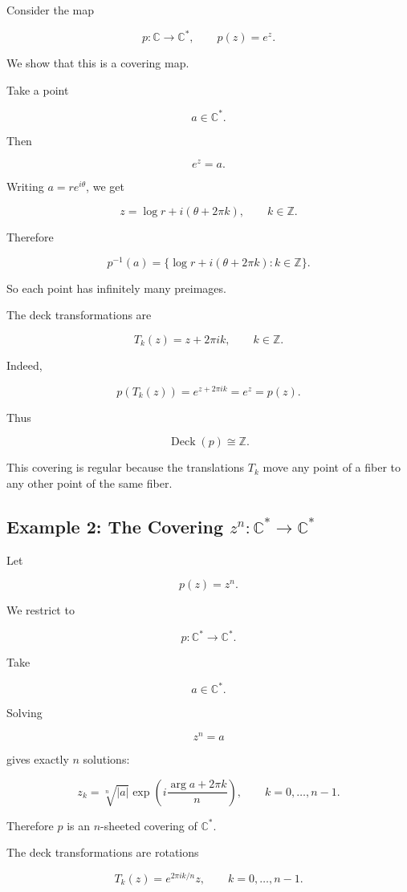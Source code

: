 \documentclass[12pt,a4paper]{article}
\theoremstyle{notespace}
\begin{document}
Consider the map

\[
p:\mathbb C\to\mathbb C^*,
\qquad
p(z)=e^z.
\]

We show that this is a covering map.

Take a point

\[
a\in\mathbb C^*.
\]

Then

\[
e^z=a.
\]

Writing \(a=re^{i\theta}\), we get

\[
z=\log r+i(\theta+2\pi k),
\qquad k\in\mathbb Z.
\]

Therefore

\[
p^{-1}(a)
=
\{\log r+i(\theta+2\pi k):k\in\mathbb Z\}.
\]

So each point has infinitely many preimages.

The deck transformations are

\[
T_k(z)=z+2\pi i k,
\qquad k\in\mathbb Z.
\]

Indeed,

\[
p(T_k(z))
=
e^{z+2\pi i k}
=
e^z
=
p(z).
\]

Thus

\[
\operatorname{Deck}(p)\cong\mathbb Z.
\]

This covering is regular because the translations \(T_k\) move any point of a fiber to any other point of the same fiber.

\subsection{Example 2: The Covering \(z^n:\mathbb C^*\to\mathbb C^*\)}

Let

\[
p(z)=z^n.
\]

We restrict to

\[
p:\mathbb C^*\to\mathbb C^*.
\]

Take

\[
a\in\mathbb C^*.
\]

Solving

\[
z^n=a
\]

gives exactly \(n\) solutions:

\[
z_k=
\sqrt[n]{|a|}
\exp\left(i\frac{\arg a+2\pi k}{n}\right),
\qquad
k=0,\dots,n-1.
\]

Therefore \(p\) is an \(n\)-sheeted covering of \(\mathbb C^*\).

The deck transformations are rotations

\[
T_k(z)
=
e^{2\pi i k/n}z,
\qquad
k=0,\dots,n-1.
\]
\end{document}
